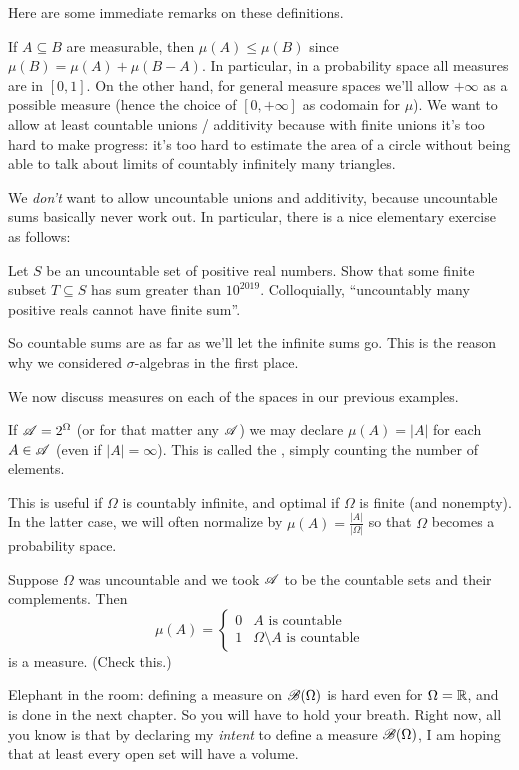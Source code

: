 \begin{remark}
Here are some immediate remarks on these definitions.
\begin{itemize}
	\ii If $A \subseteq B$ are measurable,
	then $\mu(A) \le \mu(B)$ since $\mu(B) = \mu(A) + \mu(B-A)$.
	\ii In particular, in a probability space all measures are in $[0,1]$.
	On the other hand, for general measure spaces we'll allow $+\infty$
	as a possible measure
	(hence the choice of $[0,+\infty]$ as codomain for $\mu$).
	\ii We want to allow at least countable unions / additivity
	because with finite unions it's too hard to make progress:
	it's too hard to estimate the area of a circle
	without being able to talk about limits of countably infinitely many triangles.
	\end{itemize}
\end{remark}
We \emph{don't} want to allow uncountable unions and additivity,
because uncountable sums basically never work out.
In particular, there is a nice elementary exercise as follows:
\begin{exercise}
	[Tricky]
	Let $S$ be an uncountable set of positive real numbers.
	Show that some finite subset $T \subseteq S$ has sum greater than $10^{2019}$.
	Colloquially, ``uncountably many positive reals cannot have finite sum''.
\end{exercise}
So countable sums are as far as we'll let the infinite sums go.
This is the reason why we considered $\sigma$-algebras in the first place.


\begin{example}
	[Measures]
	We now discuss measures on each of the spaces
	in our previous examples.
	\begin{enumerate}[(a)]
		\ii If $\mathscr A = 2^\Omega$ (or for that matter any $\mathscr A$)
		we may declare $\mu(A) = |A|$ for each $A \in \mathscr A$
		(even if $|A| = \infty$).
		This is called the ,
		simply counting the number of elements.

		This is useful if $\Omega$ is countably infinite,
		and optimal if $\Omega$ is finite (and nonempty).
		In the latter case, we will often normalize by
		$\mu(A) = \frac{|A|}{|\Omega|}$
		so that $\Omega$ becomes a probability space.

		\ii Suppose $\Omega$ was uncountable
		and we took $\mathscr A$ to be the countable sets and their complements.
		Then
		\[
			\mu(A) = \begin{cases}
				0 & \text{$A$ is countable} \\
				1 & \text{$\Omega \setminus A$ is countable}
			\end{cases}
		\]
		is a measure. (Check this.)

		\ii Elephant in the room:
		defining a measure on $\mathscr B(\Omega)$ is hard even for $\Omega = \mathbb R$,
		and is done in the next chapter.
		So you will have to hold your breath.
		Right now, all you know is that by declaring my \emph{intent}
		to define a measure $\mathscr B(\Omega)$,
		I am hoping that at least every open set will have a volume.
	\end{enumerate}
\end{example}


